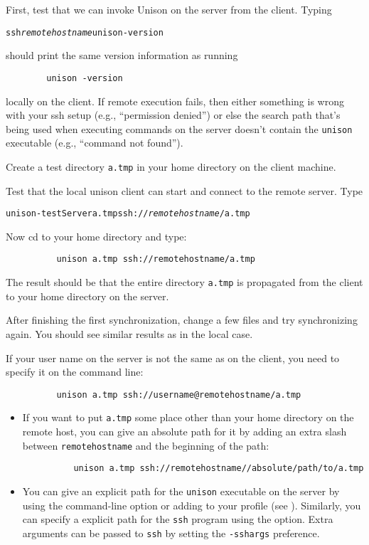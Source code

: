\documentclass{article}
\newcommand{\NT}[1]{\textit{#1}}
\begin{document}
First, test that we can invoke Unison on the server from the client.
Typing
\begin{alltt}
        ssh \NT{remotehostname} unison -version
\end{alltt}
should print the same version information as running
\begin{verbatim}
        unison -version
\end{verbatim}
locally on the client.  If remote execution fails, then either
something is wrong with your ssh setup (e.g., ``permission denied'')
or else the search path that's being used when executing commands on
the server doesn't contain the \verb|unison| executable (e.g.,
``command not found'').

Create a test directory {\tt a.tmp} in your home directory on the client
machine.

Test that the local unison client can start and connect to the
remote server.  Type
\begin{alltt}
          unison -testServer a.tmp ssh://\NT{remotehostname}/a.tmp
\end{alltt}

Now cd to your home directory and type:
\begin{verbatim}
          unison a.tmp ssh://remotehostname/a.tmp
\end{verbatim}
The result should be that the entire directory {\tt a.tmp} is propagated
from the client to your home directory on the server.

After finishing the first synchronization, change a few files and try
synchronizing again.  You should see similar results as in the local
case.

If your user name on the server is not the same as on the client, you
need to specify it on the command line:
\begin{verbatim}
          unison a.tmp ssh://username@remotehostname/a.tmp
\end{verbatim}

\begin{itemize}
\item If you want to put \verb|a.tmp| some place other than your home
directory on the remote host, you can give an absolute path for it by
adding an extra slash between \verb|remotehostname| and the beginning
of the path:
\begin{verbatim}
          unison a.tmp ssh://remotehostname//absolute/path/to/a.tmp
\end{verbatim}

\item You can give an explicit path for the \verb|unison| executable
  on the server by using the command-line option  or adding
   to your profile (see
  ).  Similarly, you can specify a
  explicit path for the \verb|ssh| program using the 
  option.
  Extra arguments can be passed to \verb|ssh| by setting the
  \verb|-sshargs| preference.
\end{itemize}
\end{document}
